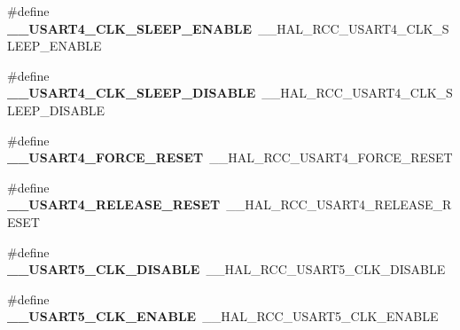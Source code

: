 \begin{DoxyCompactItemize}
\item 
\hypertarget{group___h_a_l___r_c_c___aliased_gae998f7bc7193852b391c17b3d919dc6b}{\#define {\bfseries \-\_\-\-\_\-\-U\-S\-A\-R\-T4\-\_\-\-C\-L\-K\-\_\-\-S\-L\-E\-E\-P\-\_\-\-E\-N\-A\-B\-L\-E}~\-\_\-\-\_\-\-H\-A\-L\-\_\-\-R\-C\-C\-\_\-\-U\-S\-A\-R\-T4\-\_\-\-C\-L\-K\-\_\-\-S\-L\-E\-E\-P\-\_\-\-E\-N\-A\-B\-L\-E}\label{group___h_a_l___r_c_c___aliased_gae998f7bc7193852b391c17b3d919dc6b}

\item 
\hypertarget{group___h_a_l___r_c_c___aliased_ga521d2e55e5207d611debbe98b2a7a22e}{\#define {\bfseries \-\_\-\-\_\-\-U\-S\-A\-R\-T4\-\_\-\-C\-L\-K\-\_\-\-S\-L\-E\-E\-P\-\_\-\-D\-I\-S\-A\-B\-L\-E}~\-\_\-\-\_\-\-H\-A\-L\-\_\-\-R\-C\-C\-\_\-\-U\-S\-A\-R\-T4\-\_\-\-C\-L\-K\-\_\-\-S\-L\-E\-E\-P\-\_\-\-D\-I\-S\-A\-B\-L\-E}\label{group___h_a_l___r_c_c___aliased_ga521d2e55e5207d611debbe98b2a7a22e}

\item 
\hypertarget{group___h_a_l___r_c_c___aliased_ga342c60e019e63a7d8e932557a6dfc35a}{\#define {\bfseries \-\_\-\-\_\-\-U\-S\-A\-R\-T4\-\_\-\-F\-O\-R\-C\-E\-\_\-\-R\-E\-S\-E\-T}~\-\_\-\-\_\-\-H\-A\-L\-\_\-\-R\-C\-C\-\_\-\-U\-S\-A\-R\-T4\-\_\-\-F\-O\-R\-C\-E\-\_\-\-R\-E\-S\-E\-T}\label{group___h_a_l___r_c_c___aliased_ga342c60e019e63a7d8e932557a6dfc35a}

\item 
\hypertarget{group___h_a_l___r_c_c___aliased_ga3381ddee2f7d2103d68173317808e96e}{\#define {\bfseries \-\_\-\-\_\-\-U\-S\-A\-R\-T4\-\_\-\-R\-E\-L\-E\-A\-S\-E\-\_\-\-R\-E\-S\-E\-T}~\-\_\-\-\_\-\-H\-A\-L\-\_\-\-R\-C\-C\-\_\-\-U\-S\-A\-R\-T4\-\_\-\-R\-E\-L\-E\-A\-S\-E\-\_\-\-R\-E\-S\-E\-T}\label{group___h_a_l___r_c_c___aliased_ga3381ddee2f7d2103d68173317808e96e}

\item 
\hypertarget{group___h_a_l___r_c_c___aliased_gadca81993c4e9a134d292ee509f2108da}{\#define {\bfseries \-\_\-\-\_\-\-U\-S\-A\-R\-T5\-\_\-\-C\-L\-K\-\_\-\-D\-I\-S\-A\-B\-L\-E}~\-\_\-\-\_\-\-H\-A\-L\-\_\-\-R\-C\-C\-\_\-\-U\-S\-A\-R\-T5\-\_\-\-C\-L\-K\-\_\-\-D\-I\-S\-A\-B\-L\-E}\label{group___h_a_l___r_c_c___aliased_gadca81993c4e9a134d292ee509f2108da}

\item 
\hypertarget{group___h_a_l___r_c_c___aliased_gad959221f7e570f55a18bc2bf2e849b06}{\#define {\bfseries \-\_\-\-\_\-\-U\-S\-A\-R\-T5\-\_\-\-C\-L\-K\-\_\-\-E\-N\-A\-B\-L\-E}~\-\_\-\-\_\-\-H\-A\-L\-\_\-\-R\-C\-C\-\_\-\-U\-S\-A\-R\-T5\-\_\-\-C\-L\-K\-\_\-\-E\-N\-A\-B\-L\-E}\label{group___h_a_l___r_c_c___aliased_gad959221f7e570f55a18bc2bf2e849b06}


\end{DoxyCompactItemize}
